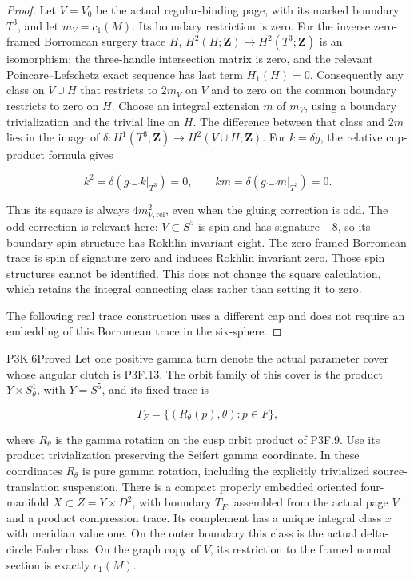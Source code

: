 \begin{proof}
Let \(V=V_0\) be the actual regular-binding page, with its marked
boundary \(T^3\), and let \(m_V=c_1(M)\).  Its boundary restriction is
zero.  For the inverse zero-framed Borromean surgery trace \(H\),
\(H^2(H;\mathbf Z)\to H^2(T^3;\mathbf Z)\) is an isomorphism: the
three-handle intersection matrix is zero, and the relevant
Poincare–Lefschetz exact sequence has last term \(H_1(H)=0\).
Consequently any class on \(V\cup H\) that restricts to \(2m_V\) on
\(V\) and to zero on the common boundary restricts to zero on \(H\).
Choose an integral extension \(m\) of \(m_V\), using a boundary
trivialization and the trivial line on \(H\).  The difference between
that class and \(2m\) lies in the image of
\(\delta:H^1(T^3;\mathbf Z)\to H^2(V\cup H;\mathbf Z)\).
For \(k=\delta g\), the relative cup-product formula gives

\[
 k^2=\delta(g\smile k|_{T^3})=0,\qquad
 km=\delta(g\smile m|_{T^3})=0.
\]

Thus its square is always \(4m_{V,\mathrm{rel}}^2\), even when the
gluing correction is odd.  The odd correction is relevant here:
\(V\subset S^5\) is spin and has signature \(-8\), so its boundary
spin structure has Rokhlin invariant eight.  The zero-framed
Borromean trace is spin of signature zero and induces Rokhlin
invariant zero.  Those spin structures cannot be identified.  This
does not change the square calculation, which retains the integral
connecting class rather than setting it to zero.

The following real trace construction uses a different cap and does
not require an embedding of this Borromean trace in the six-sphere.
\end{proof}

\begin{statement}{P3K.6}{Proved}
Let one positive gamma turn denote the actual parameter cover whose
angular clutch is P3F.13.  The orbit family of this cover is the product
\(Y\times S^1_\theta\), with \(Y=S^5\), and its fixed trace is

\[
 T_F=\{(R_\theta(p),\theta):p\in F\},
\]

where \(R_\theta\) is the gamma rotation on the cusp orbit product of
P3F.9.  Use its product trivialization preserving the Seifert gamma
coordinate.  In these coordinates \(R_\theta\) is pure gamma
rotation, including the explicitly trivialized source-translation
suspension.  There is a compact properly embedded oriented four-manifold
\(X\subset Z=Y\times D^2\), with boundary \(T_F\), assembled from the
actual page \(V\) and a product compression trace.  Its complement
has a unique integral class \(x\) with meridian value one.  On the
outer boundary this class is the actual delta-circle Euler class.
On the graph copy of \(V\), its restriction to the framed normal
section is exactly \(c_1(M)\).
\end{statement}

